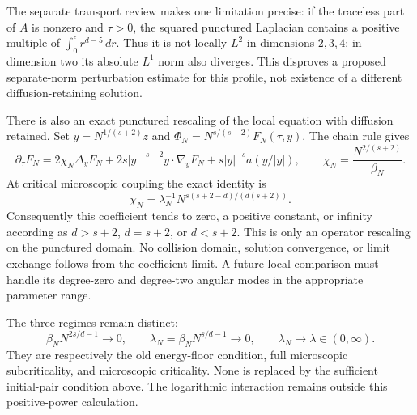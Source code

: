 \documentclass[11pt]{article}
\begin{document}
The separate transport review makes one limitation precise: if the
traceless part of $A$ is nonzero and $\tau>0$, the squared punctured
Laplacian contains a positive multiple of
$\int_0^\epsilon r^{d-5}\,dr$. Thus it is not locally $L^2$ in
dimensions $2,3,4$; in dimension two its absolute $L^1$ norm also diverges.
This disproves a proposed separate-norm perturbation estimate for this
profile, not existence of a different diffusion-retaining solution.

There is also an exact punctured rescaling of the local equation with
diffusion retained. Set $y=N^{1/(s+2)}z$ and
$\Phi_N=N^{s/(s+2)}F_N(\tau,y)$. The chain rule gives
\[
 \partial_\tau F_N=2\chi_N\Delta_yF_N+
       2s|y|^{-s-2}y\cdot\nabla_yF_N+s|y|^{-s}a(y/|y|),
 \qquad \chi_N=\frac{N^{2/(s+2)}}{\beta_N}.
\]
At critical microscopic coupling the exact identity is
\[
 \chi_N=\lambda_N^{-1}
       N^{s(s+2-d)/(d(s+2))}.
\]
Consequently this coefficient tends to zero, a positive constant, or
infinity according as $d>s+2$, $d=s+2$, or $d<s+2$.
This is only an operator rescaling on the punctured domain. No collision
domain, solution convergence, or limit exchange follows from the
coefficient limit. A future local comparison must handle its degree-zero
and degree-two angular modes in the appropriate parameter range.

The three regimes remain distinct:
\[
 \beta_NN^{2s/d-1}\to0,\qquad
 \lambda_N=\beta_NN^{s/d-1}\to0,\qquad
 \lambda_N\to\lambda\in(0,\infty).
\]
They are respectively the old energy-floor condition, full microscopic
subcriticality, and microscopic criticality. None is replaced by
the sufficient initial-pair condition above. The logarithmic interaction
remains outside this positive-power calculation.
\end{document}
